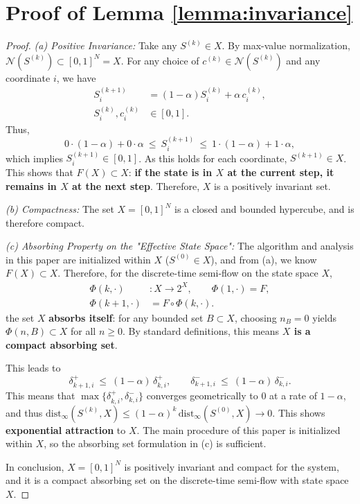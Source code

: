 \documentclass{ccjnl}
\begin{document}
\section{Proof of Lemma \ref{lemma:invariance}}
\label{app:proof_lemma_invariance}
\begin{proof}
\textit{(a) Positive Invariance:}
Take any $S^{(k)}\in X$. By max-value normalization, $\mathcal N(S^{(k)})\subset[0,1]^N=X$. For any choice of $c^{(k)}\in\mathcal N(S^{(k)})$ and any coordinate $i$, we have
\begin{equation}
\begin{aligned}
S^{(k+1)}_i&=(1-\alpha)S^{(k)}_i+\alpha\,c^{(k)}_i,\\
S^{(k)}_i,c^{(k)}_i&\in[0,1].
\end{aligned}
\end{equation}
Thus,
\begin{equation}
0\cdot(1-\alpha)+0\cdot\alpha\ \le\ S^{(k+1)}_i\ \le\ 1\cdot(1-\alpha)+1\cdot\alpha,
\end{equation}
which implies $S^{(k+1)}_i\in[0,1]$. As this holds for each coordinate, $S^{(k+1)}\in X$. This shows that $F(X)\subset X$: \textbf{if the state is in $X$ at the current step, it remains in $X$ at the next step}. Therefore, $X$ is a positively invariant set.

\textit{(b) Compactness:}
The set $X=[0,1]^N$ is a closed and bounded hypercube, and is therefore compact.

\textit{(c) Absorbing Property on the "Effective State Space":}
The algorithm and analysis in this paper are initialized within $X$ ($S^{(0)}\in X$), and from (a), we know $F(X)\subset X$. Therefore, for the discrete-time semi-flow on the state space $X$,
\begin{equation}
\begin{aligned}
\Phi(k,\cdot)&:X\to 2^X,\qquad \Phi(1,\cdot)=F,\\
\Phi(k+1,\cdot)&=F\circ\Phi(k,\cdot).
\end{aligned}
\end{equation}
the set $X$ \textbf{absorbs itself}: for any bounded set $B\subset X$, choosing $n_B=0$ yields $\Phi(n,B)\subset X$ for all $n\ge 0$. By standard definitions, this means \textbf{$X$ is a compact absorbing set}.



This leads to
\begin{equation}
\delta^+_{k+1,i}\ \le\ (1-\alpha)\,\delta^+_{k,i},\qquad 
\delta^-_{k+1,i}\ \le\ (1-\alpha)\,\delta^-_{k,i}.
\end{equation}
This means that $\max\{\delta^+_{k,i},\delta^-_{k,i}\}$ converges geometrically to 0 at a rate of $1-\alpha$, and thus $\mathrm{dist}_\infty(S^{(k)},X)\le (1-\alpha)^k\,\mathrm{dist}_\infty(S^{(0)},X)\to0$. This shows \textbf{exponential attraction} to $X$. The main procedure of this paper is initialized within $X$, so the absorbing set formulation in (c) is sufficient.

In conclusion, $X=[0,1]^N$ is positively invariant and compact for the system, and it is a compact absorbing set on the discrete-time semi-flow with state space $X$.
\end{proof}
\end{document}
